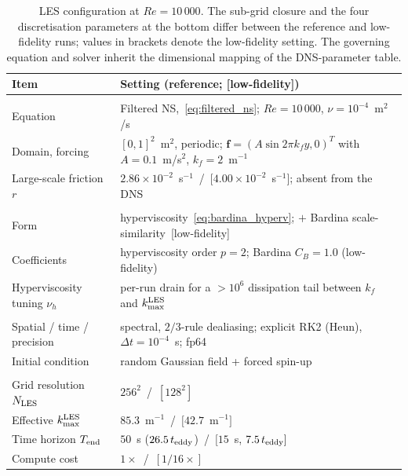 \begin{table}[!htbp]
    \centering
    \caption{LES configuration at $Re=10\,000$. The sub-grid closure and the four discretisation parameters at the bottom differ between the reference and low-fidelity runs; values in brackets denote the low-fidelity setting. The governing equation and solver inherit the dimensional mapping of the DNS-parameter table.}
    \label{tab:les_params}
    \footnotesize
    \setlength{\tabcolsep}{5pt}
    \begin{tabularx}{\textwidth}{
        @{}>{\raggedright\arraybackslash}p{5.6cm}
        >{\raggedright\arraybackslash}X@{}
    }
    \toprule
    \textbf{Item} & \textbf{Setting (reference; [low-fidelity])} \\
    \midrule
    \multicolumn{2}{@{}l}{\emph{Governing equation}} \\
    Equation                   & Filtered NS,~\eqref{eq:filtered_ns}; $Re = 10\,000$, $\nu = 10^{-4}$~m$^2$/s \\
    Domain, forcing            & $[0,1]^2$~m$^2$, periodic; $\mathbf{f} = (A\sin 2\pi k_f y, 0)^T$ with $A=0.1$~m/s$^2$, $k_f=2$~m$^{-1}$ \\
    Large-scale friction $r$   & $2.86\times10^{-2}$~s$^{-1}$~/~$[4.00\times10^{-2}$~s$^{-1}]$; absent from the DNS \\
    \midrule
    \multicolumn{2}{@{}l}{\emph{Sub-grid closure}} \\
    Form                       & hyperviscosity~\eqref{eq:bardina_hyperv}; $+$ Bardina scale-similarity~[low-fidelity] \\
    Coefficients               & hyperviscosity order $p = 2$; Bardina $C_B = 1.0$ (low-fidelity) \\
    Hyperviscosity tuning $\nu_h$ & per-run drain for a $> 10^6$ dissipation tail between $k_f$ and $k_{\max}^{\rm LES}$ \\
    \midrule
    \multicolumn{2}{@{}l}{\emph{Solver method}} \\
    Spatial / time / precision & spectral, $2/3$-rule dealiasing; explicit RK2 (Heun), $\Delta t = 10^{-4}$~s; fp64 \\
    Initial condition          & random Gaussian field + forced spin-up \\
    \midrule
    \multicolumn{2}{@{}l}{\emph{Discretisation (reference~/~[low-fidelity])}} \\
    Grid resolution $N_{\rm LES}$        & $256^2$~/~$[128^2]$ \\
    Effective $k_{\max}^{\rm LES}$       & $85.3$~m$^{-1}$~/~$[42.7$~m$^{-1}]$ \\
    Time horizon $T_{\rm end}$           & $50$~s ($26.5\,t_{\rm eddy}$)~/~$[15$~s, $7.5\,t_{\rm eddy}]$ \\
    Compute cost                         & $1\times$~/~$[1/16\times]$ \\
    \bottomrule
    \end{tabularx}
\end{table}

